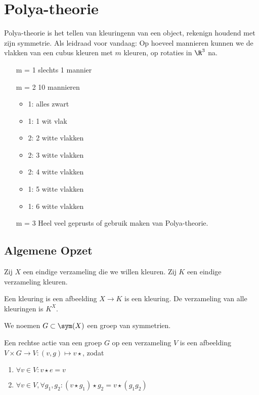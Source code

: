 \chapter{Polya-theorie} \label{chap:polya-theorie}
Polya-theorie is het tellen van kleuringenn van een object, rekenign houdend met zijn symmetrie. Als leidraad voor vandaag:
Op hoeveel mannieren kunnen we de vlakken van een cubus kleuren met $m$ kleuren, op rotaties in $\R^3$ na.
\begin{enumerate}
	\item[m = 1]  slechts 1 mannier
	\item[m = 2] 10 mannieren
		\begin{itemize}
			\item 1: alles zwart
			\item 1: 1 wit vlak
			\item 2: 2 witte vlakken
			\item 2: 3 witte vlakken
			\item 2: 4 witte vlakken
			\item 1: 5 witte vlakken
			\item 1: 6 witte vlakken
		\end{itemize}
	\item[m = 3] Heel veel geprusts of gebruik maken van Polya-theorie.
\end{enumerate}

\section{Algemene Opzet}
Zij $X$ een eindige verzameling die we willen kleuren. Zij $K$ een eindige verzameling kleuren.

\begin{definitie}
	Een kleuring is een afbeelding $X \to K$ is een kleuring. De verzameling van alle kleuringen is $K^{X}$.	
\end{definitie}

We noemen $G \subset  \sym(X)$ een groep van symmetrien.

\begin{definitie}
	Een rechtse actie van een groep $G$ op een verzameling $V$ is een afbeelding $V \times  G \to V: (v,g) \mapsto  v \star $, zodat
	\begin{enumerate}
		\item $\forall v \in V: v \star e = v$ 
		\item $\forall v \in V, \forall g_1, g_2: (v \star g_1) \star g_2 = v \star (g_1 g_2)$
	\end{enumerate}
\end{definitie}

